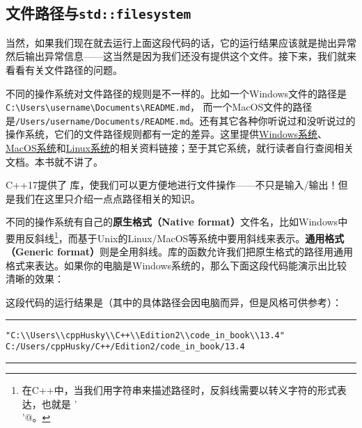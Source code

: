 \subsection*{文件路径与\texttt{std::filesystem}}
当然，如果我们现在就去运行上面这段代码的话，它的运行结果应该就是抛出异常然后输出异常信息——这当然是因为我们还没有提供这个文件。接下来，我们就来看看有关文件路径的问题。\par
不同的操作系统对文件路径的规则是不一样的。比如一个Windows文件的路径是\newline\verb|C:\Users\username\Documents\README.md|，
而一个MacOS文件的路径是\newline\verb|/Users/username/Documents/README.md|。还有其它各种你听说过和没听说过的操作系统，它们的文件路径规则都有一定的差异。这里提供\href{https://learn.microsoft.com/zh-cn/windows/win32/fileio/naming-a-file}{Windows系统}、\href{https://developer.apple.com/library/archive/documentation/FileManagement/Conceptual/FileSystemProgrammingGuide/FileSystemOverview/FileSystemOverview.html#//apple_ref/doc/uid/TP40010672-CH2-SW14}{MacOS系统}和\href{https://www.pathname.com/fhs/}{Linux系统}的相关资料链接；至于其它系统，就行读者自行查阅相关文档。本书就不讲了。\par
C++17提供了 \lstinline@filesystem@ 库，使我们可以更方便地进行文件操作——不只是输入/输出！但是我们在这里只介绍一点点路径相关的知识。\par
不同的操作系统有自己的\textbf{原生格式（Native format）}文件名，比如Windows中要用反斜线\footnote{在C++中，当我们用字符串来描述路径时，反斜线需要以转义字符的形式表达，也就是 \lstinline@'\\'@。}，而基于Unix的Linux/MacOS等系统中要用斜线来表示。\textbf{通用格式（Generic format）}则是全用斜线。\lstinline@filesystem@ 库的函数允许我们把原生格式的路径用通用格式来表达。如果你的电脑是Windows系统的，那么下面这段代码能演示出比较清晰的效果：

这段代码的运行结果是（其中的具体路径会因电脑而异，但是风格可供参考）：\\\noindent\rule{\linewidth}{.2pt}
\begin{verbatim}
"C:\\Users\\cppHusky\\C++\\Edition2\\code_in_book\\13.4"
C:/Users/cppHusky/C++/Edition2/code_in_book/13.4
\end{verbatim}\noindent\rule{\linewidth}{.2pt}\par

